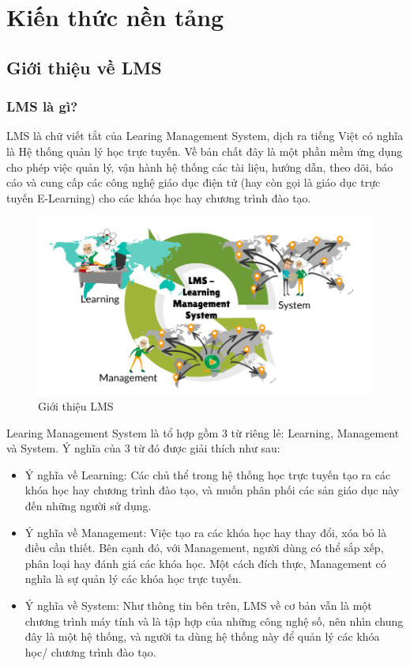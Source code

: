 \setcounter{chapter}{1}
\chapter{Kiến thức nền tảng}
\section{Giới thiệu về LMS \cite{lms}}
\subsection{LMS là gì?}
LMS là chữ viết tắt của Learing Management System, dịch ra tiếng Việt có nghĩa là Hệ thống quản lý học trực tuyến. Về bản chất đây là một phần mềm ứng dụng cho phép việc quản lý, vận hành hệ thống các tài liệu, hướng dẫn, theo dõi, báo cáo và cung cấp các công nghệ giáo dục điện tử (hay còn gọi là giáo dục trực tuyến E-Learning) cho các khóa học hay chương trình đào tạo.
\begin{center}
	\begin{figure}[htp]
		\begin{center}
			\includegraphics[scale=.5]{img/LMS}
		\end{center}
		\caption{Giới thiệu LMS}
		\label{refhinh1}
	\end{figure}
\end{center}
Learing Management System là tổ hợp gồm 3 từ riêng lẻ: Learning, Management và System. Ý nghĩa của 3 từ đó được giải thích như sau:
\begin{itemize}
	\item Ý nghĩa về Learning: Các chủ thể trong hệ thống học trực tuyến tạo ra các khóa học hay chương trình đào tạo, và muốn phân phối các sản giáo dục này đến những người sử dụng.
	\item Ý nghĩa về Management: Việc tạo ra các khóa học hay thay đổi, xóa bỏ là điều cần thiết. Bên cạnh đó, với Management, người dùng có thể sắp xếp, phân loại hay đánh giá các khóa học. Một cách đích thực, Management có nghĩa là sự quản lý các khóa học trực tuyến.
	\item Ý nghĩa về System: Như thông tin bên trên, LMS về cơ bản vẫn là một chương trình máy tính và là tập hợp của những công nghệ số, nên nhìn chung đây là một hệ thống, và người ta dùng hệ thống này để quản lý các khóa học/ chương trình đào tạo.
\end{itemize}
